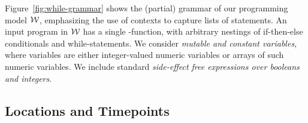 Figure~\ref{fig:while-grammar} shows the (partial) grammar of our
programming model $\mathcal{W}$,
emphasizing the  use of contexts to capture lists of statements.
An input program in $\mathcal{W}$ has a single  -function, 
with arbitrary nestings of if-then-else conditionals and
while-statements. %
%
We consider \textit{mutable and constant variables}, where
variables are either integer-valued numeric variables or arrays of such numeric variables. We include standard %
\textit{side-effect free expressions over booleans and integers}. 


\subsection{Locations and Timepoints}\label{sec:locations}

